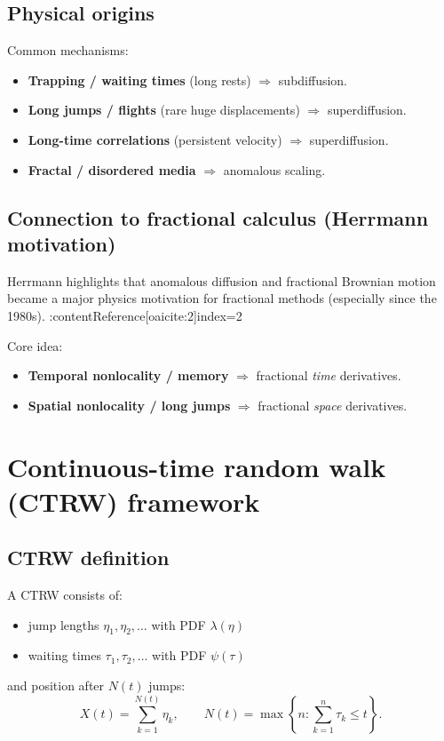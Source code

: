 \subsection{Physical origins}
Common mechanisms:
\begin{itemize}
\item \textbf{Trapping / waiting times} (long rests) $\Rightarrow$ subdiffusion.
\item \textbf{Long jumps / flights} (rare huge displacements) $\Rightarrow$ superdiffusion.
\item \textbf{Long-time correlations} (persistent velocity) $\Rightarrow$ superdiffusion.
\item \textbf{Fractal / disordered media} $\Rightarrow$ anomalous scaling.
\end{itemize}

\subsection{Connection to fractional calculus (Herrmann motivation)}
Herrmann highlights that anomalous diffusion and fractional Brownian motion
became a major physics motivation for fractional methods (especially since the 1980s). :contentReference[oaicite:2]{index=2}

Core idea:
\begin{itemize}
\item \textbf{Temporal nonlocality / memory} $\Rightarrow$ fractional \emph{time} derivatives.
\item \textbf{Spatial nonlocality / long jumps} $\Rightarrow$ fractional \emph{space} derivatives.
\end{itemize}


\section{Continuous-time random walk (CTRW) framework}

\subsection{CTRW definition}
A CTRW consists of:
\begin{itemize}
\item jump lengths $\eta_1,\eta_2,\dots$ with PDF $\lambda(\eta)$
\item waiting times $\tau_1,\tau_2,\dots$ with PDF $\psi(\tau)$
\end{itemize}
and position after $N(t)$ jumps:
\begin{equation}
X(t)=\sum_{k=1}^{N(t)}\eta_k,
\qquad
N(t)=\max\left\{n:\sum_{k=1}^n \tau_k \le t\right\}.
\end{equation}

